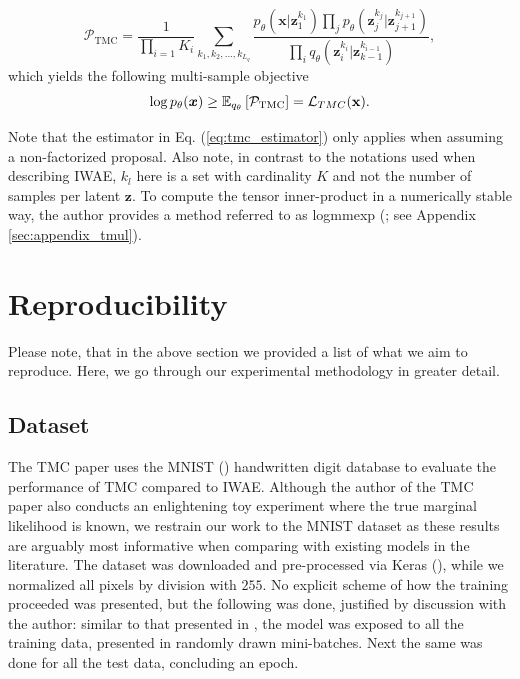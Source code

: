 \begin{equation}
    \mathcal{P}_{\text{TMC}} = \frac{1}{\prod\limits_{i=1} K_i}
    \sum\limits_{k_1, k_2, ..., k_{L_q}} \frac{p_{\theta}(\bm x|\bm z^{k_1}_1)\prod_{j}p_{\theta}(\bm z^{k_j}_{j}|\bm z^{k_{j+1}}_{j+1})}
    {\prod\limits_i q_{\theta}(\bm z_i^{k_i}| \bm z_{k-1}^{k_{i-1}})},
    \label{eq:tmc_estimator}
\end{equation}
which yields the following multi-sample objective
\begin{equation}
    \log p_{\theta}(\bm x) \geq \mathbb E_{q_{\theta}} \left[\mathcal{P}_{\text{TMC}}\right] = \mathcal{L}_{TMC} (\bold x).
    \label{eq:tmc_loss}
\end{equation}

Note that the estimator in Eq. (\ref{eq:tmc_estimator}) only applies when assuming a non-factorized proposal. Also note, in contrast to the notations used when describing IWAE, $k_l$ here is a set with cardinality $K$ and not the number of samples per latent $\bm z$. To compute the tensor inner-product in a numerically stable way, the author provides a method referred to as logmmexp (\cite{tmc}; see Appendix \ref{sec:appendix_tmul}).


\section{Reproducibility}
Please note, that in the above section we provided a list of what we aim to reproduce.
Here, we go through our experimental methodology in greater detail. 

\subsection{Dataset}
The TMC paper uses the MNIST (\cite{mnist}) handwritten digit database to evaluate the performance of TMC compared to IWAE. Although the author of the TMC paper also conducts an enlightening toy experiment where the true marginal likelihood is known, we restrain our work to the MNIST dataset as these results are arguably most informative when comparing with existing models in the literature. The dataset was downloaded and pre-processed via Keras (\cite{keras}), while we normalized all pixels by division with $255$. No explicit scheme of how the training proceeded was presented, but the following was done, justified by discussion with the author: similar to that presented in \cite{iwae}, the model was exposed to all the training data, presented in randomly drawn mini-batches. Next the same was done for all the test data, concluding an epoch.

